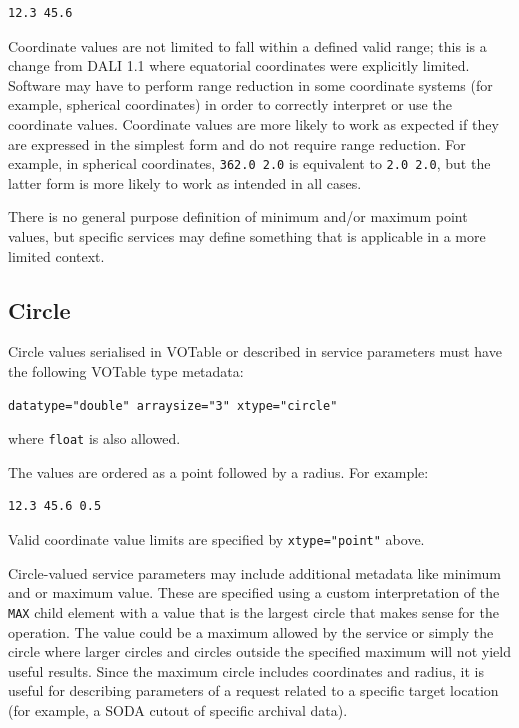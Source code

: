 \documentclass[11pt,letter]{ivoa}
\begin{document}
\begin{verbatim}
12.3 45.6
\end{verbatim}

Coordinate values are not limited to fall within a defined valid range; this is a change from
DALI 1.1 where equatorial coordinates were explicitly limited. Software may have
to perform range reduction in some coordinate systems (for example, spherical coordinates) in
order to correctly interpret or use the coordinate values. Coordinate values are more likely to
work as expected if they are expressed in the simplest form and do not require range reduction.
For example, in spherical coordinates, \verb|362.0 2.0| is equivalent to \verb|2.0 2.0|, but the
latter form is more likely to work as intended in all cases.

There is no general purpose definition of minimum and/or maximum point values, but
specific services may define something that is applicable in a more limited context.

\subsection{Circle}
Circle values serialised in VOTable or described in service parameters must have the following VOTable type metadata:
\begin{verbatim}
datatype="double" arraysize="3" xtype="circle"
\end{verbatim}
\noindent where \verb|float| is also allowed.

The values are ordered as a point followed by a radius. For example:

\begin{verbatim}
12.3 45.6 0.5
\end{verbatim}

Valid coordinate value limits are specified by \verb|xtype="point"| above.

Circle-valued service parameters may include additional metadata like minimum and
or maximum value. These are specified using a custom interpretation of the
\verb|MAX| child element with a value that is the largest circle that makes sense
for the operation. The value could be a maximum allowed by the service or simply
the circle where larger circles and circles outside the specified maximum will not
yield useful results. Since the maximum circle includes coordinates and radius,
it is useful for describing parameters of a request related to a specific target
location (for example, a SODA cutout of specific archival data).
\end{document}

